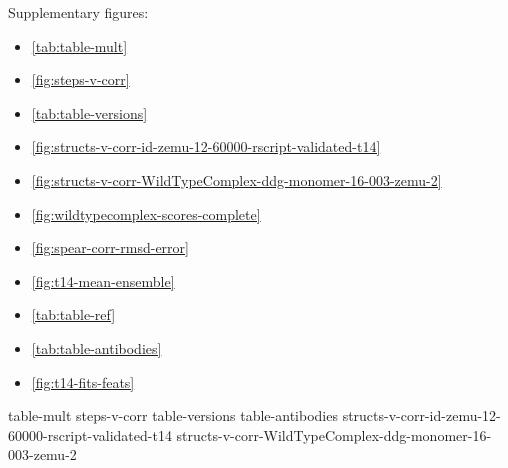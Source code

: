 

Supplementary figures:
\begin{itemize}
\item \cref{tab:table-mult}
\item \cref{fig:steps-v-corr}
\item \cref{tab:table-versions}
\item \cref{fig:structs-v-corr-id-zemu-12-60000-rscript-validated-t14}
\item \cref{fig:structs-v-corr-WildTypeComplex-ddg-monomer-16-003-zemu-2}
\item \cref{fig:wildtypecomplex-scores-complete}
\item \cref{fig:spear-corr-rmsd-error}
\item \cref{fig:t14-mean-ensemble}
\item \cref{tab:table-ref}
\item \cref{tab:table-antibodies}
\item \cref{fig:t14-fits-feats}
\end{itemize}

{table-mult}
{steps-v-corr}
{table-versions}
{table-antibodies}
{structs-v-corr-id-zemu-12-60000-rscript-validated-t14}
{structs-v-corr-WildTypeComplex-ddg-monomer-16-003-zemu-2}

